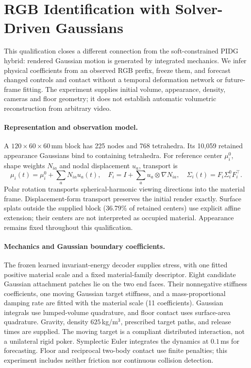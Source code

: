 \section{RGB Identification with Solver-Driven Gaussians}
\label{sec:solver-driven}
\raggedbottom
This qualification closes a different connection from the soft-constrained PIDG hybrid: rendered Gaussian motion is generated by integrated mechanics. We infer physical coefficients from an observed RGB prefix, freeze them, and forecast changed controls and contact without a temporal deformation network or future-frame fitting. The experiment supplies initial volume, appearance, density, cameras and floor geometry; it does not establish automatic volumetric reconstruction from arbitrary video.

\paragraph{Representation and observation model.}
A $120\times60\times60$\,mm block has 225 nodes and 768 tetrahedra. Its 10,059 retained appearance Gaussians bind to containing tetrahedra. For reference center $\mu_i^0$, shape weights $N_{ia}$ and nodal displacement $u_a$, transport is
\begin{equation}
 \mu_i(t)=\mu_i^0+\sum_a N_{ia}u_a(t),\quad
 F_i=I+\sum_a u_a\otimes\nabla N_{ia},\quad
 \Sigma_i(t)=F_i\Sigma_i^0 F_i^\top.
\end{equation}
Polar rotation transports spherical-harmonic viewing directions into the material frame. Displacement-form transport preserves the initial render exactly. Surface splats outside the supplied block (36.79\% of retained centers) use explicit affine extension; their centers are not interpreted as occupied material. Appearance remains fixed throughout this qualification.

\paragraph{Mechanics and Gaussian boundary coefficients.}
The frozen learned invariant-energy decoder supplies stress, with one fitted positive material scale and a fixed material-family descriptor. Eight candidate Gaussian attachment patches lie on the two end faces. Their nonnegative stiffness coefficients, one moving Gaussian target stiffness, and a mass-proportional damping rate are fitted with the material scale (11 coefficients). Gaussian integrals use lumped-volume quadrature, and floor contact uses surface-area quadrature. Gravity, density $625$\,kg/m$^3$, prescribed target paths, and release times are supplied. The moving target is a compliant distributed interaction, not a unilateral rigid poker. Symplectic Euler integrates the dynamics at $0.1$\,ms for forecasting. Floor and reciprocal two-body contact use finite penalties; this experiment includes neither friction nor continuous collision detection.


